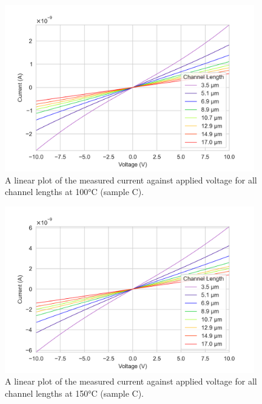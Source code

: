 \begin{figure}[h]
    \centering
    \includegraphics[width=0.97\textwidth]{Chapter6/Figs/Raster/Sample C 2019/IV/10V IV characteristics at 100 C.png}
    \caption{A linear plot of the measured current against applied voltage for all channel lengths at 100\si{\degreeCelsius} (sample C).}
    \label{appfig:C_current_voltage_100}
\end{figure}
\begin{figure}[h]
    \centering
    \includegraphics[width=0.97\textwidth]{Chapter6/Figs/Raster/Sample C 2019/IV/10V IV characteristics at 150 C.png}
    \caption{A linear plot of the measured current against applied voltage for all channel lengths at 150\si{\degreeCelsius} (sample C).}
    \label{appfig:C_current_voltage_150}
\end{figure}
